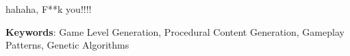 hahaha, F**k you!!!!

\textbf{Keywords}: Game Level Generation, Procedural Content Generation, Gameplay Patterns, Genetic Algorithms